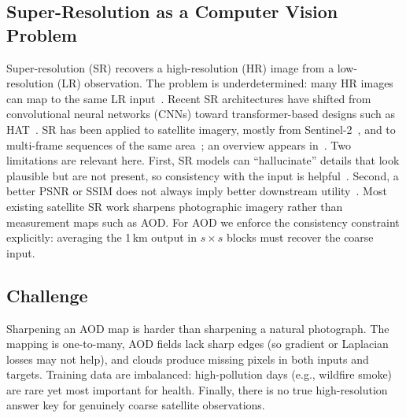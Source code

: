 \documentclass[conference]{IEEEtran}
\begin{document}
\subsection{Super-Resolution as a Computer Vision Problem}
Super-resolution (SR) recovers a high-resolution (HR) image from a low-resolution (LR) observation. The problem is underdetermined: many HR images can map to the same LR input~\cite{wang2021survey}. Recent SR architectures have shifted from convolutional neural networks (CNNs) toward transformer-based designs such as HAT~\cite{chen2023hat}. SR has been applied to satellite imagery, mostly from Sentinel-2~\cite{lanaras2018dsen2,nguyenvi2025channel,massarelli2026interp}, and to multi-frame sequences of the same area~\cite{deudon2020highresnet}; an overview appears in~\cite{digitalsense_blog}. Two limitations are relevant here. First, SR models can ``hallucinate'' details that look plausible but are not present, so consistency with the input is helpful~\cite{aybar2026sen2sr,massarelli2026interp}. Second, a better PSNR or SSIM does not always imply better downstream utility~\cite{shermeyer2019effects}. Most existing satellite SR work sharpens photographic imagery rather than measurement maps such as AOD. For AOD we enforce the consistency constraint explicitly: averaging the 1\,km output in \(s\times s\) blocks must recover the coarse input.
\subsection{Challenge}
Sharpening an AOD map is harder than sharpening a natural photograph. The mapping is one-to-many, AOD fields lack sharp edges (so gradient or Laplacian losses may not help), and clouds produce missing pixels in both inputs and targets. Training data are imbalanced: high-pollution days (e.g., wildfire smoke) are rare yet most important for health. Finally, there is no true high-resolution answer key for genuinely coarse satellite observations.
\end{document}

